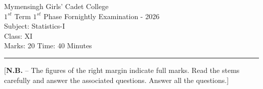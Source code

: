 \documentclass[12pt]{article}
\begin{document}
\begin{center}
Mymensingh Girls' Cadet College \\
$1^{st}$ Term  $1^{st}$ Phase Fornightly Examination - 2026 \\
Subject: Statistics-I \\
Class: XI \\
Marks: 20 \hfill Time: 40 Minutes
\end{center}



\hrule


\begin{center}
[\textbf{N.B.} – The figures of the right margin indicate full marks. Read 
the stems carefully and answer the associated questions. Answer all the questions.]\\
\end{center}

\end{document}
